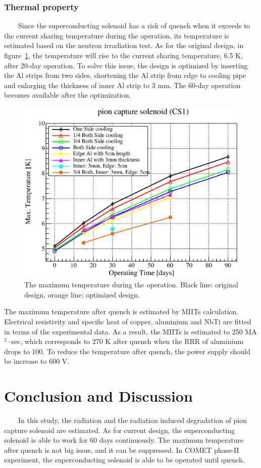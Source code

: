 \documentclass[a4paper, 10pt, twocolumn]{article}
\begin{document}
\subsubsection*{Thermal property}
~~~~Since the superconducting solenoid has a risk of quench when it exceeds to the current sharing temperature during the operation, its temperature is estimated based on the neutron irradiation test.
As for the original design, in figure~\ref{temp}, the temperature will rise to the current sharing temperature, 6.5 K, after 20-day operation.
To solve this issue, the design is optimized by inserting the Al strips from two sides, shortening the Al strip from edge to cooling pipe and enlarging the thickness of inner Al strip to 3 mm.
The 60-day operation becomes available after the optimization.
\begin{figure}[H]
 \centering
 \includegraphics[scale=0.4]{fig/maxtemp.eps}
 \caption{The maximum temperature during the operation. Black line: original design, orange line: optimized design.}
 \label{temp}
\end{figure}

The maximum temperature after quench is estimated by MIITs calculation.
Electrical resistivity and specific heat of copper, aluminium and NbTi are fitted in terms of the experimental data.
As a result, the MIITs is estimated to 250 MA$^2\cdot$sec, which corresponds to 270 K after quench when the RRR of aluminium drops to 100.
To reduce the temperature after quench, the power supply should be increase to 600 V.

\section{Conclusion and Discussion}
~~~~In this study, the radiation and the radiation induced degradation of pion capture solenoid are estimated.
As for current design, the superconducting solenoid is able to work for 60 days continuously.
The maximum temperature after quench is not big issue, and it can be suppressed.
In COMET phase-II experiment, the superconducting solenoid is able to be operated until quench.
\end{document}
